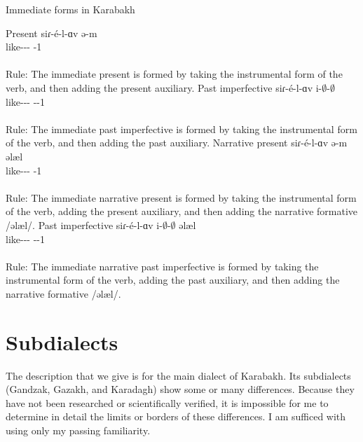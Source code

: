 \begin{exe}
	\ex Immediate forms in Karabakh \label{sent:Karabakh:morpho:verb:Immediate}
	\begin{xlist}
		\ex Present \gll 
		siɾ-\'e-l-ɑv ə-m \\ 
		like-{\thgloss}-{\infgloss}-{\ins} {\aux}-1{\sg} \\ 
		\trans {}\\
		Rule: The immediate present is formed by taking the instrumental form of the verb, and then adding the present auxiliary. 
		\ex Past imperfective \gll 
		siɾ-\'e-l-ɑv i-$\emptyset$-$\emptyset$ \\ 
		like-{\thgloss}-{\infgloss}-{\ins} {\aux}-{\pst}-1{\sg} \\ 
		\trans {}\\
		Rule: The immediate past imperfective is formed by taking the instrumental form of the verb, and then adding the past auxiliary. 
		\ex Narrative present \gll 
		siɾ-\'e-l-ɑv ə-m əlæl \\ 
		like-{\thgloss}-{\infgloss}-{\ins} {\aux}-1{\sg} {\narr} \\ 
		\trans {}\\
		Rule: The immediate narrative present is formed by taking the instrumental form of the verb, adding the present auxiliary, and then adding the narrative formative /əlæl/. 
		\ex Past imperfective \gll 
		siɾ-\'e-l-ɑv i-$\emptyset$-$\emptyset$ əlæl \\ 
		like-{\thgloss}-{\infgloss}-{\ins} {\aux}-{\pst}-1{\sg} {\narr} \\ 
		\trans {}\\
		Rule: The immediate narrative past imperfective is formed by taking the instrumental form of the verb, adding the past auxiliary, and then adding the narrative formative /əlæl/. 
	\end{xlist}
	
	
\end{exe}

\begin{adjarianpage}\label{page:70}\end{adjarianpage}%

\section{Subdialects}




The description that we give is for the main dialect of Karabakh. Its subdialects (Gandzak, Gazakh, and Karadagh) show some or many differences. Because they have not been researched or scientifically verified, it is impossible for me to determine in detail the limits or borders of these differences. I am sufficed with using only my passing familiarity.

